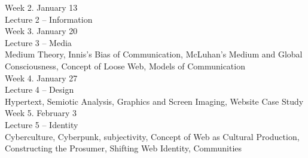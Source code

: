 {Week 2. January 13 \\
Lecture 2 – Information \\

Week 3. January 20 \\
Lecture 3 – Media \\
Medium Theory, Innis’s Bias of Communication, McLuhan’s Medium and Global Consciousness, Concept of Loose Web, Models of Communication \\

Week 4. January 27 \\
Lecture 4 – Design \\
Hypertext, Semiotic Analysis, Graphics and Screen Imaging, Website Case Study \\

Week 5. February 3 \\
Lecture 5 – Identity \\
Cyberculture, Cyberpunk,  subjectivity, Concept of Web as Cultural Production, Constructing the Prosumer, Shifting Web Identity, Communities \\

}
